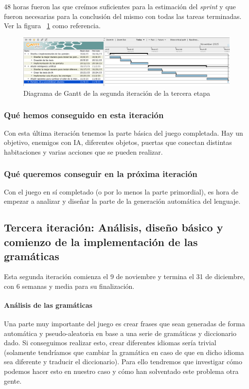 48 horas fueron las que creímos suficientes para la estimación del \textit{sprint} y que fueron necesarias para la conclusión del mismo con todas las tareas terminadas. Ver la figura ~\ref{fig:sec3it2} como referencia.

\begin{figure}
    \includegraphics[width=\textwidth,height=\textheight,keepaspectratio]{./img/sec3it2.png}
  \caption{Diagrama de Gantt de la segunda iteración de la tercera etapa}
  \label{fig:sec3it2}
\end{figure}

\subsubsection{Qué hemos conseguido en esta iteración}

Con esta última iteración tenemos la parte básica del juego completada. Hay un objetivo, enemigos con IA, diferentes objetos, puertas que conectan distintas habitaciones y varias acciones que se pueden realizar.

\subsubsection{Qué queremos conseguir en la próxima iteración}

Con el juego en sí completado (o por lo menos la parte primordial), es hora de empezar a analizar y diseñar la parte de la generación automática del lenguaje.

\subsection{Tercera iteración: Análisis, diseño básico y comienzo de la implementación de las gramáticas}

Esta segunda iteración comienza el 9 de noviembre y termina el 31 de diciembre, con 6 semanas y media para su finalización.

\paragraph{Análisis de las gramáticas} Una parte muy importante del juego es crear frases que sean generadas de forma automática y pseudo-aleatoria en base a una serie de gramáticas y diccionario dado. Si conseguimos realizar esto, crear diferentes idiomas sería trivial (solamente tendríamos que cambiar la gramática en caso de que en dicho idioma sea diferente y traducir el diccionario). Para ello tendremos que investigar cómo podemos hacer esto en nuestro caso y cómo han solventado este problema otra gente.

